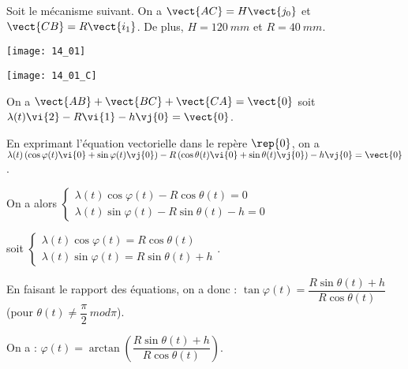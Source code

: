 \normaltrue \difficilefalse \tdifficilefalse
\correctiontrue


\setcounter{question}{0}%
\ifcorrection
\else
{}
\fi

\ifprof
\else
Soit le mécanisme suivant. On a $\vect{AC}=H\vect{j_0}$ et $\vect{CB}=R\vect{i_1}$. De plus, 
$H=\SI{120}{mm}$ et $R=\SI{40}{mm}$. 

\begin{marginfigure}
\texttt{[image: 14\_01]}
\end{marginfigure}
\fi


\ifprof

\begin{marginfigure}
\texttt{[image: 14\_01\_C]}
\end{marginfigure}
\else
\fi

\ifprof
On a $\vect{AB}+\vect{BC}+\vect{CA}=\vect{0}$ soit 
$\lambda(t)\vi{2}-R\vi{1}-h\vj{0}=\vect{0}$.

En exprimant l'équation vectorielle dans le repère $\rep{0}$, on a 
$\lambda(t)\left( \cos\varphi(t)\vi{0}+\sin\varphi(t)\vj{0}\right)-R\left( \cos\theta(t)\vi{0}+\sin\theta(t)\vj{0}\right)-h\vj{0}=\vect{0}$.

On a alors 
$
\left\{
\begin{array}{l}
\lambda(t)\cos\varphi(t)-R \cos\theta(t)=0 \\
\lambda(t)\sin\varphi(t)-R\sin\theta(t)-h=0
\end{array}
\right.
$

soit 
$
\left\{
\begin{array}{l}
\lambda(t)\cos\varphi(t)=R \cos\theta(t) \\
\lambda(t)\sin\varphi(t)=R\sin\theta(t)+h
\end{array}
\right.
$.

En faisant le rapport des équations, on a donc : $\tan\varphi(t)=\dfrac{R\sin\theta(t)+h}{R \cos\theta(t)}$ (pour $\theta(t)\neq \dfrac{\pi}{2} \, mod \pi$).

\else
\fi

\ifprof
On a : $ \varphi(t)=\arctan \left( \dfrac{R\sin\theta(t)+h}{R \cos\theta(t)}\right)$.

